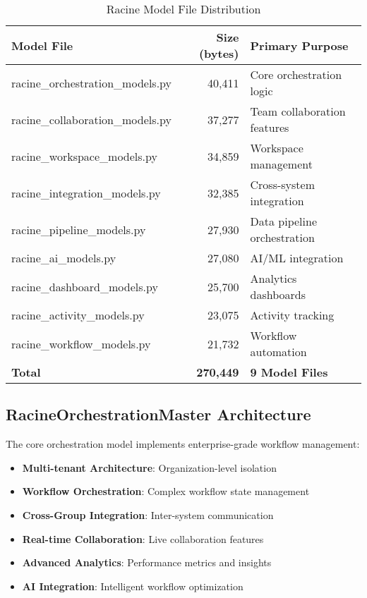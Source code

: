 \begin{table}[h!]
\centering
\begin{tabular}{|l|r|l|}
\hline
\textbf{Model File} & \textbf{Size (bytes)} & \textbf{Primary Purpose} \\
\hline
racine\_orchestration\_models.py & 40,411 & Core orchestration logic \\
racine\_collaboration\_models.py & 37,277 & Team collaboration features \\
racine\_workspace\_models.py & 34,859 & Workspace management \\
racine\_integration\_models.py & 32,385 & Cross-system integration \\
racine\_pipeline\_models.py & 27,930 & Data pipeline orchestration \\
racine\_ai\_models.py & 27,080 & AI/ML integration \\
racine\_dashboard\_models.py & 25,700 & Analytics dashboards \\
racine\_activity\_models.py & 23,075 & Activity tracking \\
racine\_workflow\_models.py & 21,732 & Workflow automation \\
\hline
\textbf{Total} & \textbf{270,449} & \textbf{9 Model Files} \\
\hline
\end{tabular}
\caption{Racine Model File Distribution}
\end{table}

\subsection{RacineOrchestrationMaster Architecture}

The core orchestration model implements enterprise-grade workflow management:

\begin{itemize}
    \item \textbf{Multi-tenant Architecture}: Organization-level isolation
    \item \textbf{Workflow Orchestration}: Complex workflow state management
    \item \textbf{Cross-Group Integration}: Inter-system communication
    \item \textbf{Real-time Collaboration}: Live collaboration features
    \item \textbf{Advanced Analytics}: Performance metrics and insights
    \item \textbf{AI Integration}: Intelligent workflow optimization
\end{itemize}

